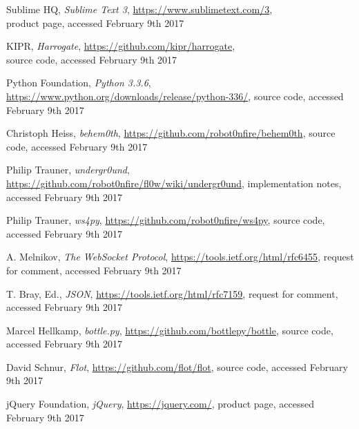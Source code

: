 \documentclass[conference]{IEEEtran}
\begin{document}
\begin{thebibliography}{1}

Sublime HQ, \emph{Sublime Text 3}, \url{https://www.sublimetext.com/3},\\ product page,
accessed February 9th 2017

KIPR, \emph{Harrogate}, \url{https://github.com/kipr/harrogate},\\ source code,
accessed February 9th 2017

Python Foundation, \emph{Python 3.3.6}, \url{https://www.python.org/downloads/release/python-336/}, source code, accessed February 9th 2017

Christoph Heiss, \emph{behem0th}, \url{https://github.com/robot0nfire/behem0th}, source code, accessed February 9th 2017

Philip Trauner, \emph{undergr0und}, \url{https://github.com/robot0nfire/fl0w/wiki/undergr0und}, implementation notes, accessed February 9th 2017

Philip Trauner, \emph{ws4py}, \url{https://github.com/robot0nfire/ws4py}, source code, accessed February 9th 2017

A. Melnikov, \emph{The WebSocket Protocol}, \url{https://tools.ietf.org/html/rfc6455}, request for comment, accessed February 9th 2017

T. Bray, Ed., \emph{JSON}, \url{https://tools.ietf.org/html/rfc7159}, request for comment, accessed February 9th 2017

Marcel Hellkamp, \emph{bottle.py}, \url{https://github.com/bottlepy/bottle}, source code, accessed February 9th 2017

David Schnur, \emph{Flot}, \url{https://github.com/flot/flot}, source code, accessed February 9th 2017

jQuery Foundation, \emph{jQuery}, \url{https://jquery.com/}, product page, accessed February 9th 2017

\end{thebibliography}
\end{document}

